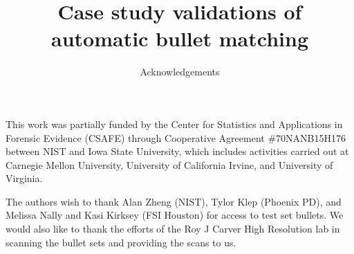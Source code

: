 \documentclass{article}
\author{Acknowledgements}
\title{Case study validations of automatic bullet matching}
\date{}
\begin{document}
\maketitle

This work was partially funded by the Center for Statistics and Applications in Forensic Evidence (CSAFE) through Cooperative Agreement \#70NANB15H176 between NIST and Iowa State University, which includes activities carried out at Carnegie Mellon University, University of California Irvine, and University of Virginia.\vspace{1cm}

The authors wish to thank Alan Zheng (NIST), Tylor Klep (Phoenix PD), and Melissa Nally and Kasi Kirksey (FSI Houston) for access to test set bullets. We would also like to thank the efforts of the Roy J Carver High Resolution lab in scanning the bullet sets and providing the scans to us. 
\end{document}
